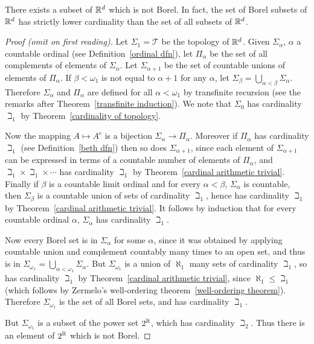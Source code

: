 \begin{lemma}\label{Borel sigma algebra}
There exists a subset of $\mathbb{R}^d$ which is not Borel.
In fact, the set of Borel subsets of $\mathbb{R}^d$ has strictly lower cardinality than the set of all subsets of $\mathbb{R}^d$.
\end{lemma}
\begin{proof}[Proof (omit on first reading)]
Let $\Sigma_1 = \mathcal T$ be the topology of $\mathbb{R}^d$.
Given $\Sigma_\alpha$, $\alpha$ a countable ordinal (see Definition~\ref{ordinal dfn}), let $\Pi_\alpha$ be the set of all complements of elements of $\Sigma_\alpha$.
Let $\Sigma_{\alpha+1}$ be the set of countable unions of elements of $\Pi_\alpha$.
If $\beta < \omega_1$ is not equal to $\alpha+1$ for any $\alpha$, let $\Sigma_{\beta} = \bigcup_{\alpha < \beta} \Sigma_\alpha$.
Therefore $\Sigma_\alpha$ and $\Pi_\alpha$ are defined for all $\alpha < \omega_1$ by transfinite recursion (see the remarks after Theorem~\ref{transfinite induction}).
We note that $\Sigma_0$ has cardinality $\beth_1$ by Theorem~\ref{cardinality of topology}.

Now the mapping $A \mapsto A^c$ is a bijection $\Sigma_{\alpha} \to \Pi_\alpha$.
Moreover if $\Pi_\alpha$ has cardinality $\beth_1$ (see Definition~\ref{beth dfn}) then so does $\Sigma_{\alpha+1}$, since each element of $\Sigma_{\alpha+1}$ can be expressed in terms of a countable number of elements of $\Pi_\alpha$, and $\beth_1 \times \beth_1 \times \cdots$ has cardinality $\beth_1$ by Theorem~\ref{cardinal arithmetic trivial}.
Finally if $\beta$ is a countable limit ordinal and for every $\alpha < \beta$, $\Sigma_\alpha$ is countable, then $\Sigma_\beta$ is a countable union of sets of cardinality $\beth_1$, hence has cardinality $\beth_1$ by Theorem~\ref{cardinal arithmetic trivial}.
It follows by induction that for every countable ordinal $\alpha$, $\Sigma_\alpha$ has cardinality $\beth_1$.

Now every Borel set is in $\Sigma_\alpha$ for some $\alpha$, since it was obtained by applying countable union and complement countably many times to an open set, and thus is in $\Sigma_{\omega_1} = \bigcup_{\alpha < \omega_1} \Sigma_\alpha$.
But $\Sigma_{\omega_1}$ is a union of $\aleph_1$ many sets of cardinality $\beth_1$, so has cardinality $\beth_1$ by Theorem~\ref{cardinal arithmetic trivial},
since $\aleph_1 \leq \beth_1$ (which follows by Zermelo's well-ordering theorem~\ref{well-ordering theorem}).
Therefore $\Sigma_{\omega_1}$ is the set of all Borel sets, and has cardinality $\beth_1$.

But $\Sigma_{\omega_1}$ is a subset of the power set $2^{\mathbb{R}}$, which has cardinality $\beth_2$. Thus there is an element of $2^{\mathbb{R}}$ which is not Borel.
\end{proof}

